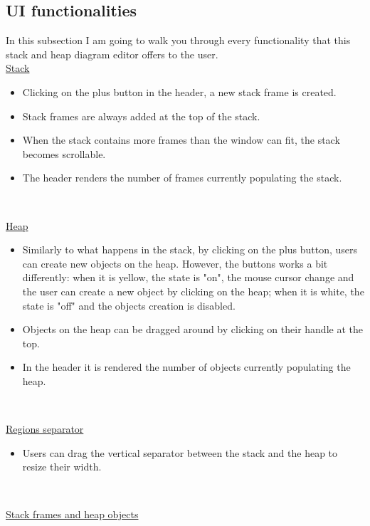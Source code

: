 \documentclass[]{usiinfbachelorproject}
\begin{document}
\vspace{\fill}
\pagebreak

\subsection{UI functionalities}

In this subsection I am going to walk you through every functionality that this stack and heap diagram editor offers to the user.\\

\ul{Stack}

\begin{itemize}
	\item Clicking on the plus button in the header, a new stack frame is created.
	\item Stack frames are always added at the top of the stack.
	\item When the stack contains more frames than the window can fit, the stack becomes scrollable. 
	\item The header renders the number of frames currently populating the stack.
\end{itemize}\

\ul{Heap}

\begin{itemize}
	\item Similarly to what happens in the stack, by clicking on the plus button, users can create new objects on the heap. However, the buttons works a bit differently: when it is yellow, the state is "on", the mouse cursor change and the user can create a new object by clicking on the heap; when it is white, the state is "off" and the objects creation is disabled.
	\item Objects on the heap can be dragged around by clicking on their handle at the top.
	\item In the header it is rendered the number of objects currently populating the heap.
\end{itemize}\

\ul{Regions separator}

\begin{itemize}
	\item Users can drag the vertical separator between the stack and the heap to resize their width.
\end{itemize}\

\ul{Stack frames and heap objects}
\end{document}
